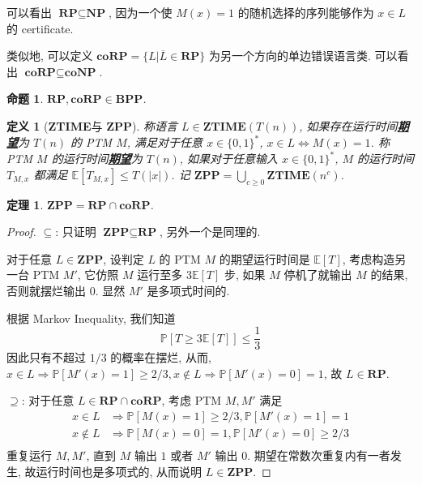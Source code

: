 \documentclass[8pt]{article}
\theoremstyle{compact}
\newtheorem{theorem}{定理}[section]
\newtheorem{definition}{定义}[section]
\newtheorem{proposition}{命题}[section]
\def\obj#1{\textbf{\uline{#1}}}
\def\le{\leqslant}
\def\ge{\geqslant}
\def\NP{\textbf{NP}}
\def\coNP{\textbf{coNP}}
\def\BPP{\textbf{BPP}}
\def\RP{\textbf{RP}}
\def\coRP{\textbf{coRP}}
\def\ZTIME{\textbf{ZTIME}}
\def\ZPP{\textbf{ZPP}}
\begin{document}
可以看出 $\RP \subseteq \NP$, 因为一个使 $M(x) = 1$ 的随机选择的序列能够作为 $x \in L$ 的 certificate.

类似地, 可以定义 $\coRP = \{L | \overline{L} \in \RP\}$ 为另一个方向的单边错误语言类. 可以看出 $\coRP \subseteq \coNP$.
\begin{proposition}
	$\RP, \coRP \in \BPP$.
\end{proposition}
\begin{definition}[\ZTIME 与 \ZPP]
	称语言 $L \in \ZTIME(T(n))$, 如果存在运行时间\obj{期望}为 $T(n)$ 的 PTM $M$, 满足对于任意 $x \in \{0, 1\}^*$, $x \in L \Leftrightarrow M(x) = 1$. 称 PTM $M$ 的运行时间\obj{期望}为 $T(n)$, 如果对于任意输入 $x \in \{0, 1\}^*$, $M$ 的运行时间 $T_{M, x}$ 都满足 $\mathbb E[T_{M, x}] \le T(|x|)$. 记 $\ZPP = \bigcup_{c \ge 0}\ZTIME(n^c)$.
\end{definition}
\begin{theorem}
	$\ZPP = \RP \cap \coRP$.
\end{theorem}
\begin{proof}
	$\subseteq$: 只证明 $\ZPP \subseteq \RP$, 另外一个是同理的.

	对于任意 $L \in \ZPP$, 设判定 $L$ 的 PTM $M$ 的期望运行时间是 $\mathbb E[T]$, 考虑构造另一台 PTM $M'$, 它仿照 $M$ 运行至多 $3\mathbb E[T]$ 步, 如果 $M$ 停机了就输出 $M$ 的结果, 否则就摆烂输出 $0$. 显然 $M'$ 是多项式时间的.

	根据 Markov Inequality, 我们知道 $$\mathbb P\left[T \ge 3\mathbb E[T]\right] \le \frac{1}{3}$$ 因此只有不超过 $1/3$ 的概率在摆烂, 从而, $x \in L \Rightarrow \mathbb P[M'(x) = 1] \ge 2/3, x \notin L \Rightarrow \mathbb P[M'(x) = 0] = 1$, 故 $L \in \RP$.

	$\supseteq$: 对于任意 $L \in \RP \cap \coRP$, 考虑 PTM $M, M'$ 满足 \begin{equation*}
		\begin{split}
			x \in L &\Rightarrow \mathbb P[M(x) = 1] \ge 2/3, \mathbb P[M'(x) = 1] = 1 \\
			x \notin L &\Rightarrow \mathbb P[M(x) = 0] = 1, \mathbb P[M'(x) = 0] \ge 2/3 \\
		\end{split}
	\end{equation*}
	重复运行 $M, M'$, 直到 $M$ 输出 $1$ 或者 $M'$ 输出 $0$. 期望在常数次重复内有一者发生, 故运行时间也是多项式的, 从而说明 $L \in \ZPP$.
\end{proof}
\end{document}
